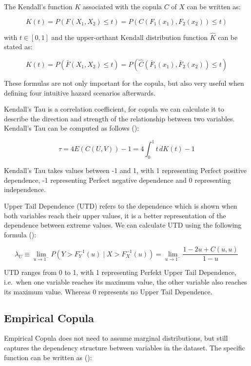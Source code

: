 \documentclass[
]{krantz}
\begin{document}
The Kendall's function \(K\) associated with the copula \(C\) of \(X\) can be written as:

\[K(t) = P\left(F(X_1, X_2) \leq t\right) = P\left(C\left(F_1(x_1), F_2(x_2)\right) \leq t\right) \tag{4} \]

with \(t \in [0,1]\) and the upper-orthant Kendall distribution function \(\hat{K}\) can be stated as:

\[\hat{K}(t) = P\left(\bar{F}(X_1, X_2) \leq t\right) = P\left(\hat{C}\left(\bar{F}_1(x_1), \bar{F}_2(x_2)\right) \leq t\right) \tag{5} \]

These formulas are not only important for the copula, but also very useful when defining four intuitive hazard scenarios afterwards.

Kendall's Tau is a correlation coefficient, for copula we can calculate it to describe the direction and strength of the relationship between two variables. Kendall's Tau can be computed as follows (\citet{barbe1996b}):

\[\tau = 4E(C(U, V)) - 1= 4 \int_{0}^{1} t \, dK(t) - 1 \tag{6} \]

Kendall's Tau takes values between -1 and 1, with 1 representing Perfect positive dependence, -1 representing Perfect negative dependence and 0 representing independence.

Upper Tail Dependence (UTD) refers to the dependence which is shown when both variables reach their upper values, it is a better representation of the dependence between extreme values. We can calculate UTD using the following formula (\citet{fischer2006}):

\[\lambda_U \equiv \lim_{{u \to 1^-}} P(Y > F_Y^{-1}(u) \mid X > F_X^{-1}(u))= \lim_{u \to 1^{-}} \frac{1 - 2u + C(u, u)}{1 - u} \tag{7} \]

UTD ranges from 0 to 1, with 1 representing Perfekt Upper Tail Dependence, i.e.~when one variable reaches its maximum value, the other variable also reaches its maximum value. Whereas 0 represents no Upper Tail Dependence.

\subsection{Empirical Copula}\label{empirical-copula}

Empirical Copula does not need to assume marginal distributions, but still captures the dependency structure between variables in the dataset. The specific function can be written as (\citet{bucher2013}):
\end{document}
